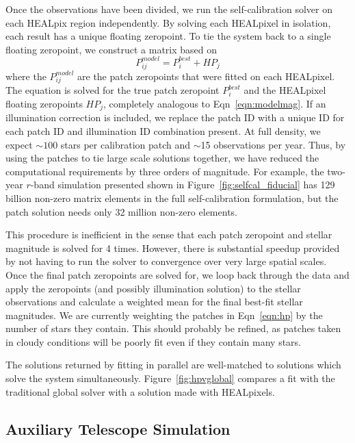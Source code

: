 \documentclass[12pt,preprint]{aastex}
\begin{document}
Once the observations have been divided, we run the self-calibration solver on each HEALpix region independently.  By solving each HEALpixel in isolation, each result has a unique floating zeropoint.  To tie the system back to a single floating zeropoint, we construct a matrix based on
\begin{equation}\label{eqn:hp}
P^{model}_{ij} = P^{best}_{i} + HP_{j}
\end{equation}
where the $P^{model}_{ij}$ are the patch zeropoints that were fitted on each HEALpixel.  The equation is solved for the true patch zeropoint $P^{best}_{i}$ and the HEALpixel floating zeropoints $HP_{j}$, completely analogous to Eqn~\ref{eqn:modelmag}.  If an illumination correction is included, we replace the patch ID with a unique ID for each patch ID and illumination ID combination present.  At full density, we expect $\sim100$ stars per calibration patch and $\sim$15 observations per year.  Thus, by using the patches to tie large scale solutions together, we have reduced the computational requirements by three orders of magnitude.  For example, the two-year $r$-band simulation presented shown in Figure~\ref{fig:selfcal_fiducial} has 129 billion non-zero matrix elements in the full self-calibration formulation, but the patch solution needs only 32 million non-zero elements.  

This procedure is inefficient in the sense that each patch zeropoint and stellar magnitude is solved for 4 times.  However, there is substantial speedup provided by not having to run the solver to convergence over very large spatial scales.  Once the final patch zeropoints are solved for, we loop back through the data and apply the zeropoints (and possibly illumination solution) to the stellar observations and calculate a weighted mean for the final best-fit stellar magnitudes.  We are currently weighting the patches in Eqn~\ref{eqn:hp} by the number of stars they contain.  This should probably be refined, as patches taken in cloudy conditions will be poorly fit even if they contain many stars.  

The solutions returned by fitting in parallel are well-matched to solutions which solve the system simultaneously.  Figure~\ref{fig:hpvglobal} compares a fit with the traditional global solver with a solution made with HEALpixels.  






\subsection{Auxiliary Telescope Simulation}
\end{document}
